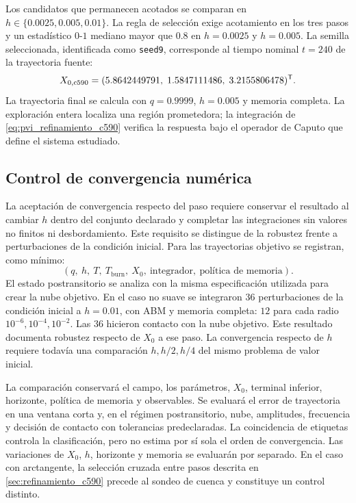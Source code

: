 Los candidatos que permanecen acotados se comparan en
\(h\in\{0.0025,0.005,0.01\}\). La regla de selección exige acotamiento en los
tres pasos y un estadístico \(0\)-\(1\) mediano mayor que \(0.8\) en
\(h=0.0025\) y \(h=0.005\). La semilla seleccionada, identificada como
\texttt{seed9}, corresponde al tiempo nominal \(t=240\) de la trayectoria
fuente:
\begin{equation}
X_{0,\mathrm{c590}}=
(5.8642449791,\;1.5847111486,\;3.2155806478)^{\mathsf T}.
\label{eq:semilla_c590}
\end{equation}
La trayectoria final se calcula con \(q=0.9999\), \(h=0.005\) y memoria
completa. La exploración entera localiza una región prometedora; la integración
de \cref{eq:pvi_refinamiento_c590} verifica la respuesta bajo el operador de
Caputo que define el sistema estudiado.

\subsection{Control de convergencia numérica}
\label{sec:control_numerico}

La aceptación de convergencia respecto del paso requiere conservar el resultado
al cambiar \(h\) dentro del conjunto declarado y completar las integraciones
sin valores no finitos ni desbordamiento. Este requisito se distingue de la
robustez frente a perturbaciones de la condición inicial. Para las trayectorias
objetivo se registran, como mínimo:
\begin{equation}
\left(
q,\ h,\ T,\ T_{\mathrm{burn}},\ X_0,\
\text{integrador},\ \text{política de memoria}
\right).
\label{eq:contrato_numerico_minimo}
\end{equation}
El estado postransitorio se analiza con la misma especificación utilizada para crear
la nube objetivo. En el caso no suave se integraron \(36\) perturbaciones de
la condición inicial a \(h=0.01\), con ABM y memoria completa: \(12\) para
cada radio \(10^{-6},10^{-4},10^{-2}\). Las \(36\) hicieron contacto con la
nube objetivo. Este resultado documenta robustez respecto de \(X_0\) a ese
paso. La convergencia respecto de \(h\) requiere todavía una comparación
\(h,h/2,h/4\) del mismo problema de valor inicial.

La comparación conservará el campo, los
parámetros, \(X_0\), terminal inferior, horizonte, política de memoria y
observables. Se evaluará el error de trayectoria en una ventana corta y, en el
régimen postransitorio, nube, amplitudes, frecuencia y decisión de contacto con
tolerancias predeclaradas. La coincidencia de etiquetas controla la
clasificación, pero no estima por sí sola el orden de convergencia. Las variaciones de \(X_0\), \(h\), horizonte y memoria se evaluarán por separado.
En el caso con arctangente, la selección cruzada entre pasos descrita en
\cref{sec:refinamiento_c590} precede al sondeo de cuenca y constituye un
control distinto.
